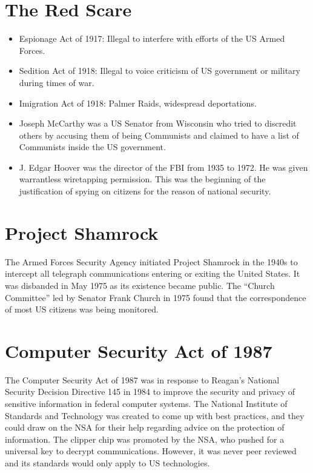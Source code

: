 \documentclass[letterpaper, 12pt]{article}
\begin{document}
\section*{The Red Scare}
\begin{itemize}
  \item Espionage Act of 1917: Illegal to interfere with efforts of the US
    Armed Forces.
  \item Sedition Act of 1918: Illegal to voice criticism of US government or
    military during times of war.
  \item Imigration Act of 1918: Palmer Raids, widespread deportations.
  \item Joseph McCarthy was a US Senator from Wisconsin who tried to discredit
    others by accusing them of being Communists and claimed to have a list of
    Communists inside the US government.
  \item J. Edgar Hoover was the director of the FBI from 1935 to 1972. He was
    given warrantless wiretapping permission. This was the beginning of the
    justification of spying on citizens for the reason of national security.
\end{itemize}

\section*{Project Shamrock}
The Armed Forces Security Agency initiated Project Shamrock in the 1940s to
intercept all telegraph communications entering or exiting the United States.
It was disbanded in May 1975 as its existence became public. The
``Church Committee'' led by Senator Frank Church in 1975 found that
the correspondence of most US citizens was being monitored.

\section*{Computer Security Act of 1987}
The Computer Security Act of 1987 was in response to Reagan's National Security
Decision Directive 145 in 1984 to improve the security and privacy of sensitive
information in federal computer systems. The National Institute of Standards
and Technology was created to come up with best practices, and they could draw
on the NSA for their help regarding advice on the protection of information.
The clipper chip was promoted by the NSA, who pushed for a universal key to
decrypt communications. However, it was never peer reviewed and its standards
would only apply to US technologies.
\end{document}
